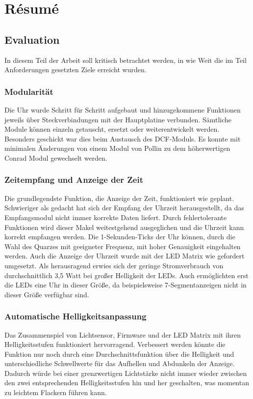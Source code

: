 \section{Résumé}
\subsection{Evaluation}
In diesem Teil der Arbeit soll kritisch betrachtet werden, in wie Weit die im
Teil Anforderungen gesetzten Ziele erreicht wurden.
\subsubsection{Modularität}
\vspace{-.5ex}
Die Uhr wurde Schritt für Schritt aufgebaut und hinzugekommene Funktionen
jeweils über Steckverbindungen mit der Hauptplatine verbunden. Sämtliche Module können
einzeln getauscht, ersetzt oder weiterentwickelt werden. Besonders geschickt war
dies beim Austausch des DCF-Moduls. Es konnte mit minimalen Änderungen von einem
Modul von Pollin zu dem höherwertigen Conrad Modul gewechselt werden. 
\subsubsection{Zeitempfang und Anzeige der Zeit}
\vspace{-.5ex}
Die grundlegendste Funktion, die Anzeige der Zeit, funktioniert wie geplant. Schwieriger als
gedacht hat sich der Empfang der Uhrzeit herausgestellt, da das
Empfangsmodul nicht immer korrekte Daten liefert. Durch fehlertolerante
Funktionen wird dieser Makel weitestgehend ausgeglichen und die Uhrzeit kann
korrekt empfangen werden. Die 1-Sekunden-Ticks der Uhr können, durch die Wahl
des Quarzes mit geeigneter Frequenz, mit hoher Genauigkeit eingehalten werden.
Auch die Anzeige der Uhrzeit wurde mit der LED Matrix wie gefordert umgesetzt.
Als herausragend erwies sich der geringe Stromverbrauch von durchschnittlich 3,5 Watt bei großer Helligkeit
der LEDs. Auch ermöglichten erst die LEDs eine Uhr in dieser Größe, da beispielsweise
7-Segmentanzeigen nicht in dieser Größe verfügbar sind.
%
\subsubsection{Automatische Helligkeitsanpassung}
\vspace{-.5ex}
Das Zusammenspiel von Lichtsensor, Firmware und der LED Matrix mit ihren
Helligkeitsstufen funktioniert hervorragend. Verbessert werden könnte die
Funktion nur noch durch eine Durchschnittsfunktion über die Helligkeit und
unterschiedliche Schwellwerte für das Aufhellen und Abdunkeln der
Anzeige. Dadurch würde bei einer grenzwertigen Lichtstärke
nicht immer wieder zwischen den zwei entsprechenden Helligkeitsstufen hin und
her geschalten, was momentan zu leichtem Flackern führen kann.
%
